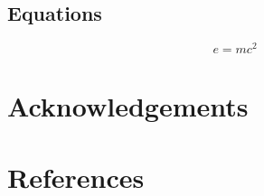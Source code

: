 \documentclass[review]{elsarticle}
\begin{document}
\subsection{Equations}
\begin{equation}
\label{eq:emc}
e = mc^2
\end{equation}

\section*{Acknowledgements}

\section*{References}

\end{document}
